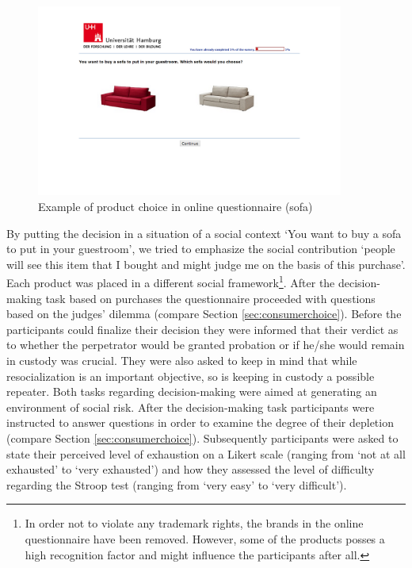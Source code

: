 \begin{figure}[h!]
\center
	\includegraphics[trim= 0pt 8cm 0pt 2cm, clip=true,width=0.9\textwidth]{images/os_product_choice.png}
  \caption{Example of product choice in online questionnaire (sofa)}\label{fig:os_product_choice}
\end{figure}
By putting the decision in a situation of a social context ‘You want to buy a sofa to put in your guestroom’, we tried to emphasize the social contribution ‘people will see this item that I bought and might judge me on the basis of this purchase’. Each product was placed in a different social framework\footnote{In order not to violate any trademark rights, the brands in the online questionnaire have been removed. However, some of the products posses a high recognition factor and might influence the participants after all.}. After the decision-making task based on purchases the questionnaire proceeded with questions based on the judges’ dilemma (compare Section \ref{sec:consumerchoice}). Before the participants could finalize their decision they were informed that their verdict as to whether the perpetrator would be granted probation or if he/she would remain in custody was crucial. They were also asked to keep in mind that while resocialization is an important objective, so is keeping in custody a possible repeater. Both tasks regarding decision-making were aimed at generating an environment of social risk. After the decision-making task participants were instructed to answer questions in order to examine the degree of their depletion (compare Section \ref{sec:consumerchoice}). Subsequently participants were asked to state their perceived level of exhaustion on a Likert scale (ranging from ‘not at all exhausted’ to ‘very exhausted’) and how they assessed the level of difficulty regarding the Stroop test (ranging from ‘very easy’ to ‘very difficult’).\par

